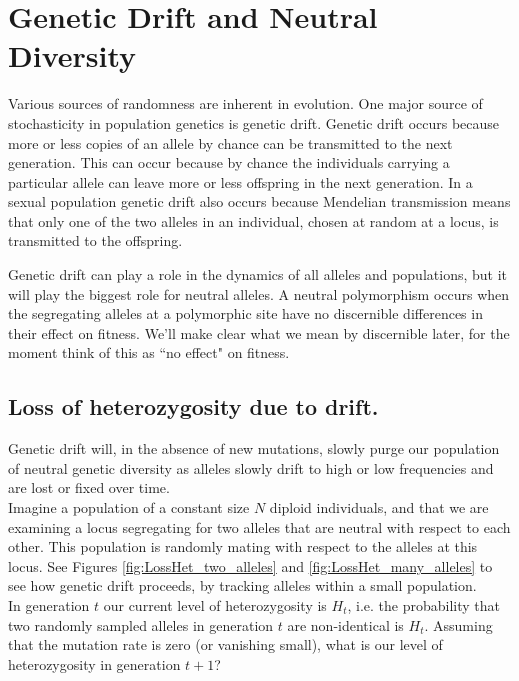 
\section{Genetic Drift and Neutral Diversity}

Various sources of randomness are inherent in evolution.  One major source of
stochasticity in population genetics is genetic drift.  Genetic drift occurs
because more or less copies of an allele by chance can be transmitted to the
next generation. This can occur because by chance the individuals carrying a
particular allele can leave more or less offspring in the next generation. In a
sexual population genetic drift also occurs because Mendelian transmission
means that only one of the two alleles in an individual, chosen at random at a
locus, is transmitted to the offspring. 

Genetic drift can play a role in the dynamics of all alleles and populations,
but it will play the biggest role for neutral alleles. A neutral polymorphism
occurs when the segregating alleles at a polymorphic site have no discernible
differences in their effect on fitness. We'll make clear what we mean by discernible later, for
the moment think of this as ``no effect" on fitness. 


\subsection{Loss of heterozygosity due to drift.} \label{LossofHet} 

Genetic drift will, in the absence of new mutations, slowly purge our
population of neutral genetic diversity as alleles slowly drift to high or low
frequencies and are lost or fixed over time. \\

Imagine a population of a constant size $N$ diploid individuals, and that we
are examining a locus segregating for two alleles that are neutral with respect
to each other.  This population is randomly mating with respect to the alleles
at this locus. See Figures \ref{fig:LossHet_two_alleles} and
\ref{fig:LossHet_many_alleles} to see how genetic drift proceeds, by tracking
alleles within a small population. \\

In generation $t$ our current level of heterozygosity is $H_t$,
i.e. the probability that two randomly sampled alleles in generation
$t$ are non-identical is $H_t$. Assuming that the mutation rate is
zero (or vanishing small), what is our level of heterozygosity in
generation $t+1$?\\

